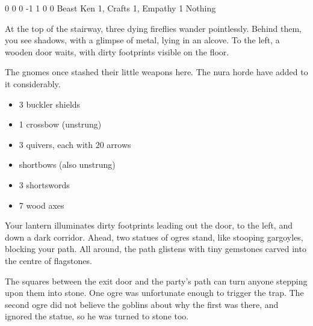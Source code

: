 \begin{multicols}{2}
{0}%
{0}%
{{0}%
{-1}%
{1}}%
{0}%
{0}%
{Beast Ken 1, Crafts 1, Empathy 1}%
{Nothing}%
{}


\begin{boxtext}

	At the top of the stairway, three dying fireflies wander pointlessly.
	Behind them, you see shadows, with a glimpse of metal, lying in an alcove.
	To the left, a wooden door waits, with dirty footprints visible on the floor.

\end{boxtext}

\begin{exampletext}

	The gnomes once stashed their little weapons here.
	The nura horde have added to it considerably.

\end{exampletext}

\begin{itemize}

	\item{3 buckler shields}
	\item{1 crossbow (unstrung)}
	\item{3 quivers, each with 20 arrows}
	\item{shortbows (also unstrung)}
	\item{3 shortswords}
	\item{7 wood axes}

\end{itemize}


\begin{boxtext}

	Your lantern illuminates dirty footprints leading out the door, to the left, and down a dark corridor.
	Ahead, two statues of ogres stand, like stooping gargoyles, blocking your path.
	All around, the path glistens with tiny gemstones carved into the centre of flagstones.

\end{boxtext}

The squares between the exit door and the party's path can turn anyone stepping upon them into stone.
One ogre was unfortunate enough to trigger the trap.
The second ogre did not believe the goblins about why the first was there, and ignored the statue, so he was turned to stone too.


\end{multicols}
